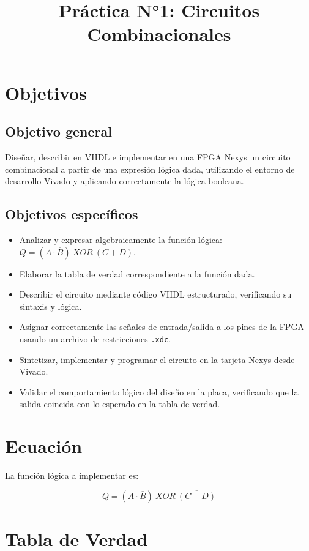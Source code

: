 \documentclass[a4paper,12pt]{article}
\title{Práctica N°1: Circuitos Combinacionales}
\date{}
\begin{document}
\maketitle
\tableofcontents
\newpage

\section{Objetivos}

\subsection*{Objetivo general}
Diseñar, describir en VHDL e implementar en una FPGA Nexys un circuito combinacional a partir de una expresión lógica dada, utilizando el entorno de desarrollo Vivado y aplicando correctamente la lógica booleana.

\subsection*{Objetivos específicos}
\begin{itemize}
    \item Analizar y expresar algebraicamente la función lógica: \( Q = (A \cdot \overline{B}) \ XOR \ \overline{(C + D)} \).
    \item Elaborar la tabla de verdad correspondiente a la función dada.
    \item Describir el circuito mediante código VHDL estructurado, verificando su sintaxis y lógica.
    \item Asignar correctamente las señales de entrada/salida a los pines de la FPGA usando un archivo de restricciones \texttt{.xdc}.
    \item Sintetizar, implementar y programar el circuito en la tarjeta Nexys desde Vivado.
    \item Validar el comportamiento lógico del diseño en la placa, verificando que la salida coincida con lo esperado en la tabla de verdad.
\end{itemize}

\section{Ecuación}

La función lógica a implementar es:

\[
Q = (A \cdot \overline{B}) \ XOR \ \overline{(C + D)}
\]

\section{Tabla de Verdad}
\end{document}
